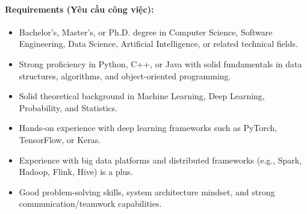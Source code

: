 \paragraph{Requirements (Yêu cầu công việc):}
\begin{itemize}
    \item Bachelor’s, Master’s, or Ph.D. degree in Computer Science, Software Engineering, Data Science, Artificial Intelligence, or related technical fields.
    \item Strong proficiency in Python, C++, or Java with solid fundamentals in data structures, algorithms, and object-oriented programming.
    \item Solid theoretical background in Machine Learning, Deep Learning, Probability, and Statistics.
    \item Hands-on experience with deep learning frameworks such as PyTorch, TensorFlow, or Keras.
    \item Experience with big data platforms and distributed frameworks (e.g., Spark, Hadoop, Flink, Hive) is a plus.
    \item Good problem-solving skills, system architecture mindset, and strong communication/teamwork capabilities.
\end{itemize}
